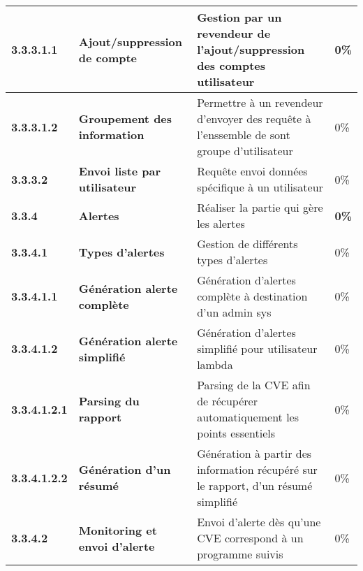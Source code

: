\begin{supertabular}{|p{2.8cm} p{6cm}|p{5cm}|R{2cm}|}
  \hspace{18pt}
  \textbf{3.3.3.1.1}  & \textbf{Ajout/suppression de compte} & Gestion par un revendeur de l'ajout/suppression des comptes utilisateur & 0\% \\
  \hline

  \hspace{18pt}
  \textbf{3.3.3.1.2}  & \textbf{Groupement des information} & Permettre à un revendeur d'envoyer des requête à l'enssemble de sont groupe d'utilisateur & 0\% \\
  \hline

  \hspace{12pt}
  \textbf{3.3.3.2}  & \textbf{Envoi liste par utilisateur} & Requête envoi données spécifique à un utilisateur  & 0\% \\
  \hline


  \hspace{6pt}
  \textbf{3.3.4}  & \textbf{Alertes} & Réaliser la partie qui gère les alertes & \textbf{0\%} \\
  \hline

  \hspace{12pt}
  \textbf{3.3.4.1}  & \textbf{Types d'alertes} & Gestion de différents types d'alertes  & 0\% \\
  \hline

  \hspace{18pt}
  \textbf{3.3.4.1.1}  & \textbf{Génération alerte complète} & Génération d'alertes complète à destination d'un admin sys & 0\% \\
  \hline

  \hspace{18pt}
  \textbf{3.3.4.1.2}  & \textbf{Génération alerte simplifié} & Génération d'alertes simplifié pour utilisateur lambda  & 0\% \\
  \hline

  \hspace{24pt}
  \textbf{3.3.4.1.2.1}  & \textbf{Parsing du rapport} & Parsing de la CVE afin de récupérer automatiquement les points essentiels & 0\% \\
  \hline

  \hspace{24pt}
  \textbf{3.3.4.1.2.2}  & \textbf{Génération d'un résumé} & Génération à partir des information récupéré sur le rapport, d'un résumé simplifié & 0\% \\
  \hline

  \hspace{12pt}
  \textbf{3.3.4.2}  & \textbf{Monitoring et envoi d'alerte} & Envoi d'alerte dès qu'une CVE correspond à un programme suivis  & 0\% \\
  \hline


\end{supertabular}
